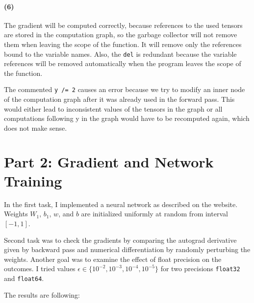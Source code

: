 \documentclass[a4paper,11pt]{article}
\begin{document}
\paragraph{(6)} The gradient will be computed correctly, because references to the used tensors are stored in the computation graph, so the garbage collector will not remove them when leaving the scope of the function.
It will remove only the references bound to the variable names.
Also, the \texttt{del} is redundant because the variable references will be removed automatically when the program leaves the scope of the function.

The commented \texttt{y /= 2} causes an error because we try to modify an inner node of the computation graph after it was already used in the forward pass.
This would either lead to inconsistent values of the tensors in the graph or all computations following y in the graph would have to be recomputed again, which does not make sense.

\section{Part 2: Gradient and Network Training}
In the first task, I implemented a neural network as described on the website.
Weights $W_1$, $b_1$, $w$, and $b$ are initialized uniformly at random from interval $[-1, 1]$.

Second task was to check the gradients by comparing the autograd derivative given by backward pass and numerical differentiation by randomly perturbing the weights.
Another goal was to examine the effect of float precision on the outcomes.
I tried values $\epsilon \in \{10^{-2}, 10^{-3}, 10^{-4}, 10^{-5}\}$ for two precisions \texttt{float32} and \texttt{float64}.

The results are following:
\end{document}
